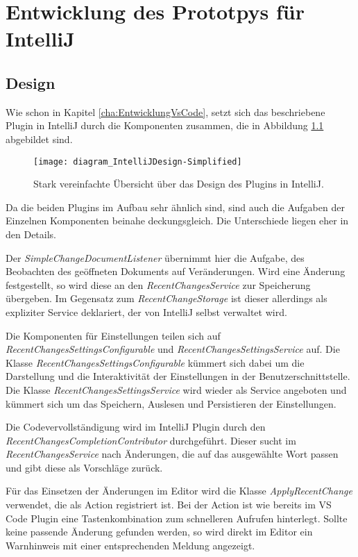 \chapter{Entwicklung des Prototpys für IntelliJ}
\label{cha:EntwicklungIntelliJ}

\section{Design}
\label{sec:EntwicklungIntelliJ_Design}

Wie schon in Kapitel \ref{cha:EntwicklungVsCode}, setzt sich das 
beschriebene Plugin in IntelliJ durch die Komponenten zusammen,
die in Abbildung \ref{fig:diagram_IntelliJDesign-Simplified} abgebildet sind.

\begin{figure}
    \centering
    \texttt{[image: diagram\_IntelliJDesign-Simplified]}
    \caption{Stark vereinfachte Übersicht über das Design des Plugins in IntelliJ.}
    \label{fig:diagram_IntelliJDesign-Simplified}
\end{figure}

Da die beiden Plugins im Aufbau sehr ähnlich sind, sind auch die Aufgaben der
Einzelnen Komponenten beinahe deckungsgleich. Die Unterschiede liegen eher in
den Details.

Der \emph{SimpleChangeDocumentListener} übernimmt hier die Aufgabe,
des Beobachten des geöffneten Dokuments auf Veränderungen. Wird
eine Änderung festgestellt, so wird diese an den \emph{RecentChangesService}
zur Speicherung übergeben. Im Gegensatz zum \emph{RecentChangeStorage}
ist dieser allerdings als expliziter Service deklariert, der von IntelliJ
selbst verwaltet wird.

Die Komponenten für Einstellungen teilen sich auf 
\emph{RecentChangesSettingsConfigurable} und \emph{RecentChangesSettingsService}
auf. Die Klasse \emph{RecentChangesSettingsConfigurable} kümmert sich dabei
um die Darstellung und die Interaktivität der Einstellungen in der Benutzerschnittstelle.
Die Klasse \emph{RecentChangesSettingsService} wird wieder als Service 
angeboten und kümmert sich um das Speichern, Auslesen und Persistieren
der Einstellungen.

Die Codevervollständigung wird im IntelliJ Plugin durch den
\emph{RecentChangesCompletionContributor} durchgeführt. Dieser
sucht im \emph{RecentChangesService} nach Änderungen, die auf
das ausgewählte Wort passen und gibt diese als Vorschläge zurück.

Für das Einsetzen der Änderungen im Editor wird die Klasse
\emph{ApplyRecentChange} verwendet, die als Action registriert ist.
Bei der Action ist wie bereits im VS Code Plugin eine Tastenkombination
zum schnelleren Aufrufen hinterlegt.
Sollte keine passende Änderung gefunden werden, so wird direkt im
Editor ein Warnhinweis mit einer entsprechenden Meldung angezeigt.

